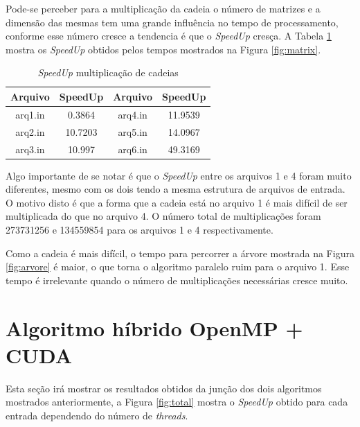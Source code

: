 \documentclass[12pt,openright,oneside,chapter=TITLE,section=TITLE,
    brazil]{utfpr-pg}
\begin{document}
Pode-se perceber para a multiplicação da cadeia o número de matrizes e a dimensão das mesmas tem uma grande influência no tempo de processamento, conforme esse número cresce a tendencia é que o \emph{SpeedUp} cresça. A Tabela \ref{tab:matrix} mostra os \emph{SpeedUp} obtidos pelos tempos mostrados na Figura \ref{fig:matrix}.

\begin{table}[h]	
	\centering
	
	\begin{tabular}{|c|c|c|c|}
		\hline
		\textbf{Arquivo} & \textbf{SpeedUp} & \textbf{Arquivo} & \textbf{SpeedUp} \\ \hline
		arq1.in          & 0.3864           & arq4.in          & 11.9539          \\ \hline
		arq2.in          & 10.7203          & arq5.in          & 14.0967          \\ \hline
		arq3.in          & 10.997           & arq6.in          & 49.3169          \\ \hline
	\end{tabular}
	
	\vspace{-0.35cm}
	\caption{\emph{SpeedUp} multiplicação de cadeias} \label{tab:matrix}
\end{table}

Algo importante de se notar é que o \emph{SpeedUp} entre os arquivos 1 e 4 foram muito diferentes, mesmo com os dois tendo a mesma estrutura de arquivos de entrada. O motivo disto é que a forma que a cadeia está no arquivo 1 é mais difícil de ser multiplicada do que no arquivo 4. O número total de multiplicações foram 273731256  e 134559854 para os arquivos 1 e 4 respectivamente. 

Como a cadeia é mais difícil, o tempo para percorrer a árvore mostrada na Figura \ref{fig:arvore} é maior, o que torna o algoritmo paralelo ruim para o arquivo 1. Esse tempo é irrelevante quando o número de multiplicações necessárias cresce muito.

\section{Algoritmo híbrido OpenMP + CUDA}
\vspace{-0.7cm}

Esta seção irá mostrar os resultados obtidos da junção dos dois algoritmos mostrados anteriormente, a Figura \ref{fig:total} mostra o \emph{SpeedUp} obtido para cada entrada dependendo do número de \emph{threads}.
\end{document}
